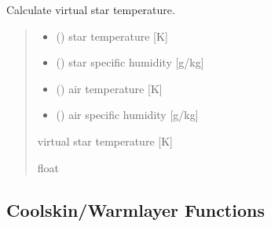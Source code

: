 \documentclass[letterpaper,10pt,english]{sphinxmanual}
\begin{document}
\begin{fulllineitems}

\pysigstartsignatures
{}
\pysigstopsignatures
\sphinxAtStartPar
Calculate virtual star temperature.
\begin{quote}\begin{description}
\begin{itemize}
\item {} 
\sphinxAtStartPar
{} () \textendash{} star temperature {[}K{]}

\item {} 
\sphinxAtStartPar
{} () \textendash{} star specific humidity {[}g/kg{]}

\item {} 
\sphinxAtStartPar
{} () \textendash{} air temperature {[}K{]}

\item {} 
\sphinxAtStartPar
{} () \textendash{} air specific humidity {[}g/kg{]}

\end{itemize}

\sphinxAtStartPar
{} \textendash{} virtual star temperature {[}K{]}

\sphinxAtStartPar
float

\end{description}\end{quote}

\end{fulllineitems}



\subsection{Cool\sphinxhyphen{}skin/Warm\sphinxhyphen{}layer Functions}
\label{\detokenize{users_guide:module-cs_wl_subs}}\label{\detokenize{users_guide:cool-skin-warm-layer-functions}}
\end{document}
